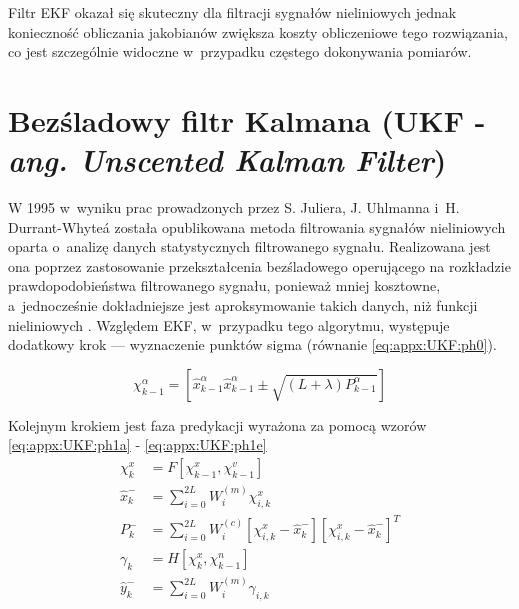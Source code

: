 Filtr EKF okazał się skuteczny dla filtracji sygnałów nieliniowych jednak konieczność obliczania jakobianów zwiększa koszty obliczeniowe tego rozwiązania, co jest szczególnie widoczne w~przypadku częstego dokonywania pomiarów. 


\section*{Bezśladowy filtr Kalmana (UKF - \emph{ang. Unscented Kalman Filter})}
\label{sec:appx:filters:UKF}
W 1995 w~wyniku prac prowadzonych przez S. Juliera, J. Uhlmanna i~H. Durrant-Whyte\'a została opublikowana \cite{Julier1995} metoda filtrowania sygnałów nieliniowych oparta o~analizę danych statystycznych filtrowanego sygnału. Realizowana jest ona poprzez zastosowanie przekształcenia bezśladowego operującego na rozkładzie prawdopodobieństwa filtrowanego sygnału, ponieważ mniej kosztowne, a~jednocześnie dokładniejsze jest aproksymowanie takich danych, niż funkcji nieliniowych \cite{Uhlmann94}.
Względem EKF, w~przypadku tego algorytmu, występuje dodatkowy krok --- wyznaczenie punktów sigma (równanie \ref{eq:appx:UKF:ph0}). 

\begin{equation}
	\chi^\alpha_{k-1} = [\widehat{x}^\alpha_{k-1} \widehat{x}^\alpha_{k-1}\pm\sqrt{(L+\lambda)P^\alpha_{k-1}}] \label{eq:appx:UKF:ph0}
\end{equation}

Kolejnym krokiem jest faza predykacji wyrażona za pomocą wzorów \ref{eq:appx:UKF:ph1a} - \ref{eq:appx:UKF:ph1e}
\begin{subequations}
	\begin{align}
		\chi^x_{k}        & = F[\chi^x_{k-1},\chi^v_{k-1}] \label{eq:appx:UKF:ph1a}                                                               \\
		\widehat{x}^-_{k} & = \sum_{i=0}^{2L}W_i^{(m)}\chi^x_{i,k}\label{eq:appx:UKF:ph1b}                                                        \\
		P^-_k             & = \sum_{i=0}^{2L}W_i^{(c)}[\chi^x_{i,k}-\widehat{x}^-_{k}][\chi^x_{i,k}-\widehat{x}^-_{k}]^T \label{eq:appx:UKF:ph1c} \\
		\gamma_k          & = H[\chi^x_k, \chi^n_{k-1}] \label{eq:appx:UKF:ph1d}                                                                  \\
		\widehat{y}^-_{k} & = \sum_{i=0}^{2L}W_i^{(m)}\gamma_{i,k} \label{eq:appx:UKF:ph1e}                                                       
	\end{align}
\end{subequations}

